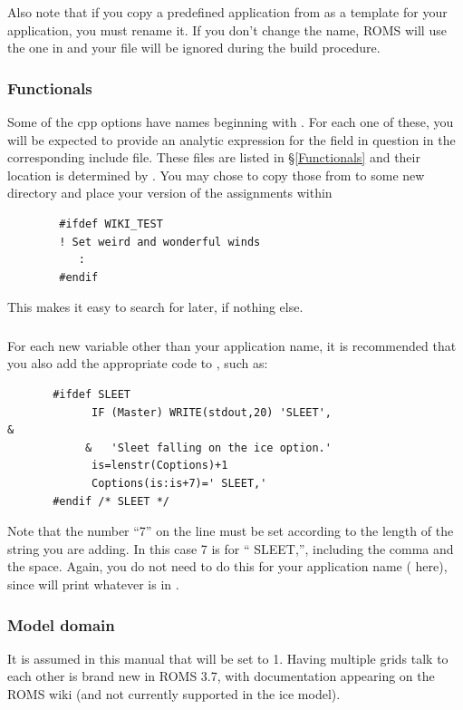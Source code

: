 Also note that if you copy a predefined application from
 as a template for your application, you must
rename it. If you don't change the name, ROMS will use the one in
 and your file will be ignored during the build
procedure.

\subsubsection{Functionals}

Some of the cpp options have names beginning with . For each one of
these, you will be expected to provide an analytic expression for the field
in question in the corresponding include file. These files
are listed in \S\ref{Functionals} and their location is determined
by . You may chose to copy those from
 to some new directory and place your version of
the assignments within
\begin{verbatim}
        #ifdef WIKI_TEST
        ! Set weird and wonderful winds
           :
        #endif
\end{verbatim}
This makes
it easy to search for later, if nothing else.

\subsubsection{}

For each new  variable other than your application name,
it is recommended that you also
add the appropriate code to , such as:
\begin{verbatim}
       #ifdef SLEET
             IF (Master) WRITE(stdout,20) 'SLEET',                      &
            &   'Sleet falling on the ice option.'
             is=lenstr(Coptions)+1
             Coptions(is:is+7)=' SLEET,'
       #endif /* SLEET */
\end{verbatim}
Note that the number ``7'' on the  line must be set
according to the length of the string you are adding.  In this case 7
is for `` SLEET,'', including the comma and the space. Again, you do not
need to do this for your application name ( here),
since  will print whatever is in .

\subsubsection{Model domain}
\label{Muddy}
It is assumed in this manual that  will be set to 1.
Having multiple grids talk to each other is brand new in ROMS 3.7,
with documentation appearing on the ROMS wiki (and not currently
supported in the ice model).

